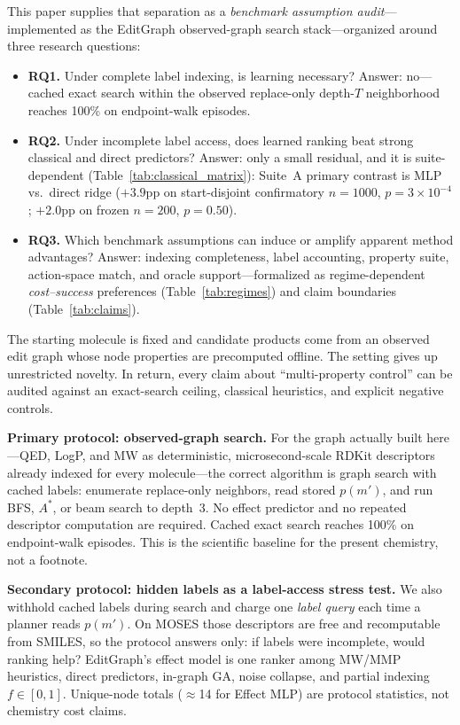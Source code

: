\documentclass[journal=jcisd8,manuscript=article,email=false]{achemso}
\begin{document}
This paper supplies that separation as a \emph{benchmark assumption audit}---implemented as the EditGraph observed-graph search stack---organized around three research questions:
\begin{itemize}
  \item \textbf{RQ1.} Under complete label indexing, is learning necessary?
  Answer: no---cached exact search within the observed replace-only depth-$T$ neighborhood reaches 100\% on endpoint-walk episodes.
  \item \textbf{RQ2.} Under incomplete label access, does learned ranking beat strong classical and direct predictors?
  Answer: only a small residual, and it is suite-dependent (Table~\ref{tab:classical_matrix}): Suite~A primary contrast is MLP vs.\ direct ridge ($+3.9$pp on start-disjoint confirmatory $n{=}1000$, $p{=}3\times10^{-4}$; $+2.0$pp on frozen $n{=}200$, $p{=}0.50$).
  \item \textbf{RQ3.} Which benchmark assumptions can induce or amplify apparent method advantages?
  Answer: indexing completeness, label accounting, property suite, action-space match, and oracle support---formalized as regime-dependent \emph{cost--success} preferences (Table~\ref{tab:regimes}) and claim boundaries (Table~\ref{tab:claims}).
\end{itemize}

The starting molecule is fixed and candidate products come from an observed edit graph whose node properties are precomputed offline. The setting gives up unrestricted novelty. In return, every claim about ``multi-property control'' can be audited against an exact-search ceiling, classical heuristics, and explicit negative controls.

\textbf{Primary protocol: observed-graph search.} For the graph actually built here---QED, LogP, and MW as deterministic, microsecond-scale RDKit descriptors already indexed for every molecule---the correct algorithm is graph search with cached labels: enumerate replace-only neighbors, read stored $p(m')$, and run BFS, $A^\ast$, or beam search to depth~3. No effect predictor and no repeated descriptor computation are required. Cached exact search reaches 100\% on endpoint-walk episodes. This is the scientific baseline for the present chemistry, not a footnote.

\textbf{Secondary protocol: hidden labels as a label-access stress test.} We also withhold cached labels during search and charge one \emph{label query} each time a planner reads $p(m')$. On MOSES those descriptors are free and recomputable from SMILES, so the protocol answers only: if labels were incomplete, would ranking help? EditGraph's effect model is one ranker among MW/MMP heuristics, direct predictors, in-graph GA, noise collapse, and partial indexing $f{\in}[0,1]$. Unique-node totals ($\approx$14 for Effect MLP) are protocol statistics, not chemistry cost claims.
\end{document}
